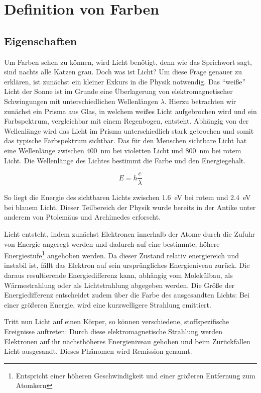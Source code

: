\documentclass[11pt]{scrreprt}
\begin{document}
\chapter{Definition von Farben}
\section{Eigenschaften }
Um Farben sehen zu können, wird Licht benötigt, denn wie das Sprichwort sagt, sind nachts alle Katzen grau.  Doch was ist Licht? Um diese Frage genauer zu erklären, ist zunächst ein kleiner Exkurs in die Physik notwendig. Das \enquote{weiße} Licht der Sonne ist im Grunde eine Überlagerung von elektromagnetischer Schwingungen mit unterschiedlichen Wellenlängen $\lambda$. Hierzu betrachten wir zunächst ein Prisma aus Glas, in welchem weißes Licht aufgebrochen wird und ein Farbspektrum, vergleichbar mit einem Regenbogen, entsteht. Abhängig von der Wellenlänge wird das Licht im Prisma unterschiedlich stark gebrochen und somit das typische Farbspektrum sichtbar.  Das für den Menschen sichtbare Licht hat eine Wellenlänge zwischen \SI{400}{\nano\meter}  bei violetten Licht und \SI{800}{\nano\meter} bei rotem Licht. Die Wellenlänge des Lichtes bestimmt die Farbe und den Energiegehalt.

\begin{equation}
	E = h \frac{c}{\lambda}
\end{equation}

 So liegt die Energie des sichtbaren Lichts zwischen  \SI{1,6}{\electronvolt} bei rotem und  \SI{2,4}{\electronvolt} bei blauem Licht. Dieser Teilbereich der Physik wurde bereits in der Antike unter anderem von Ptolemäus und Archimedes erforscht.

Licht entsteht, indem zunächst Elektronen innerhalb der Atome durch die Zufuhr von Energie angeregt werden und dadurch auf eine bestimmte, höhere Energiestufe\footnote{ Entspricht einer höheren Geschwindigkeit und einer größeren Entfernung zum Atomkern} angehoben werden. Da dieser Zustand relativ energiereich und  instabil ist, fällt das Elektron auf sein ursprüngliches Energieniveau zurück. Die daraus resultierende Energiedifferenz kann, abhängig vom Molekülbau, als Wärmestrahlung oder als Lichtstrahlung abgegeben werden. Die Größe der Energiedifferenz entscheidet zudem über die Farbe des ausgesandten Lichts: Bei einer größeren Energie, wird eine kurzwelligere Strahlung emittiert.

Tritt nun Licht auf einen Körper, so können verschiedene, stoffspezifische Ereignisse auftreten: Durch diese elektromagnetische Strahlung werden Elektronen auf ihr nächsthöheres Energieniveau gehoben und beim Zurückfallen Licht ausgesandt. Dieses Phänomen wird Remission genannt. 
\end{document}
